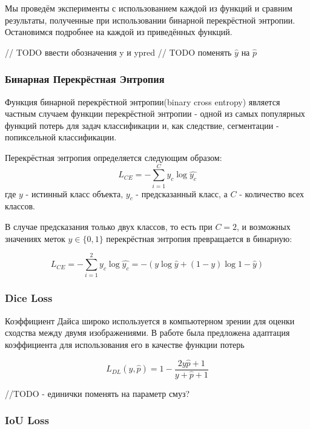 Мы проведём эксперименты с использованием каждой из функций и сравним результаты, полученные при использовании бинарной перекрёстной энтропии.
Остановимся подробнее на каждой из приведённых функций.

// TODO ввести обозначения y и ypred
// TODO поменять $\hat{y} $ на $\hat{p}$

\subsubsection{Бинарная Перекрёстная Энтропия}

Функция бинарной перекрёстной энтропии(binary cross entropy) является частным случаем функции перекрёстной энтропии - одной из самых популярных 
функций потерь для задач классификации и, как следствие, сегментации - попиксельной классификации.

Перекрёстная энтропия \cite{CE} определяется следующим образом: 
\begin{equation}
    L_{CE} = -\sum_{i=1}^{C}y_c\log{\hat{y_c}}
\end{equation}
где $y$ - истинный класс объекта, $y_c$ - предсказанный класс, а $C$ - количество 
всех классов.

В случае предсказания только двух классов, то есть при $C=2$, 
и возможных значениях меток $y \in \{0,1\}$
перекрёстная энтропия превращается в бинарную:

\begin{equation}
    L_{CE} = -\sum_{i=1}^{2}y_c\log{\hat{y_c}} = 
    -(y\log{\hat{y}} + (1-y)\log{1-\hat{y}})
\end{equation}



\subsubsection{Dice Loss} 

Коэффициент Дайса широко используется в компьютерном зрении для оценки сходства 
между двумя изображениями. В работе \cite{Dice} была предложена адаптация коэффициента 
для использования его в качестве функции потерь 

\begin{equation}
    L_{DL}(y, \hat{p} ) = 1 - \frac{2y\hat{p} + 1}{y + \hat{p} + 1}
\end{equation}

//TODO - единички поменять на параметр смуз? 


\subsubsection{IoU Loss}


